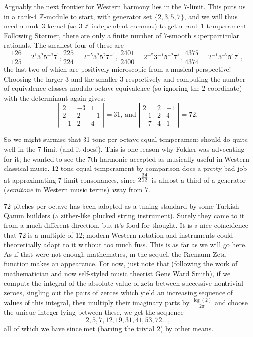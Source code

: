 \documentclass[12pt]{article}
\newcommand{\ZZ}{\mathbb{Z}}      %
\begin{document}
\par
Arguably the next frontier for Western harmony lies in the $7$-limit.  This puts us in a rank-4 $\ZZ$-module to start, with generator set $\{2,3,5,7\}$, and we will thus need a rank-$3$ kernel (so 3 $\ZZ$-independent commas) to get a rank-$1$ temperament.  Following St\o{}rmer, there are only a finite number of $7$-smooth superparticular rationals.  The smallest four of these are
\[\frac{126}{125}=2^{1}3^{2}5^{-3}7^{1},\frac{225}{224}=2^{-5}3^{2}5^{2}7^{-1}\text{, }\frac{2401}{2400}=2^{-5}3^{-1}5^{-2}7^{4}\text{, }\frac{4375}{4374}=2^{-1}3^{-7}5^{4}7^{1}\text{, }\]
the last two of which are positively microscopic from a musical perspective!  Choosing the larger 3 and the smaller 3 respectively and computing the number of equivalence classes modulo octave equivalence (so ignoring the 2 coordinate) with the determinant again gives:
\[
\left|\begin{matrix}
2 & -3 & 1 \\
2 & 2 & -1 \\
-1 & 2 & 4
\end{matrix}\right| = 31\text{, and \ \ \ }
\left|\begin{matrix}
2 & 2 & -1 \\
-1 & 2 & 4 \\
-7 & 4 & 1
\end{matrix}\right| = 72\text{.}\]
\par
So we might surmise that 31-tone-per-octave equal temperament should do quite well in the $7$ limit (and it does!).  This is one reason why Fokker was advocating for it; he wanted to see the 7th harmonic accepted as musically useful in Western classical music.  12-tone equal temperament by comparison does a pretty bad job at approximating 7-limit consonances, since $2^{\tiny{\tfrac{34}{12}}}$ is almost a third of a generator (\emph{semitone} in Western music terms) away from $7$.\\
\par
$72$ pitches per octave has been adopted as a tuning standard by some Turkish Qanun builders (a zither-like plucked string instrument).  Surely they came to it from a much different direction, but it's food for thought.  It is a nice coincidence that 72 is a multiple of 12; modern Western notation and instruments could theoretically adapt to it without too much fuss.  This is as far as we will go here.  As if that were not enough mathematics, in the sequel, the Riemann Zeta function makes an appearance.  For now, just note that (following the work of mathematician and now self-styled music theorist Gene Ward Smith), if we compute the integral of the absolute value of zeta between successive nontrivial zeroes, singling out the pairs of zeroes which yield an increasing sequence of values of this integral, then multiply their imaginary parts by $\tfrac{\log(2)}{2\pi }$ and choose the unique integer lying between these, we get the sequence 
\[2, 5, 7, 12, 19, 31, 41, 53, 72\ldots\text{,}\]
all of which we have since met (barring the trivial $2$) by other means.
\end{document}
